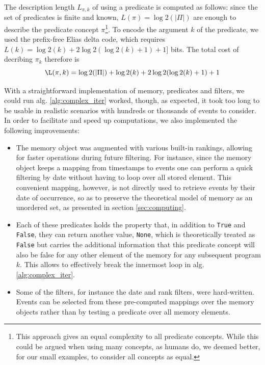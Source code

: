 \documentclass[entropy,article,submit,moreauthors,pdftex]{Definitions/mdpi}
\begin{document}
The description length $L_{\pi, k}$ of using a predicate is computed as follows: since the set of predicates is finite and known, $L(\pi) = \log2(|\Pi|)$ are enough to describe the predicate concept $\pi$\footnote{This approach gives an equal complexity to all predicate concepts. While this could be argued when using many concepts, as humans do, we deemed better, for our small examples, to consider all concepts as equal.}. To encode the argument $k$ of the predicate, we used the prefix-free Elias delta code, which requires $L(k) = \log2(k) + 2 \log2(\log2(k)+1) + 1]$ bits. The total cost of decribing $\pi_{k}$ therefore is
\begin{equation}
    \L(\pi, k) = \log2(|\Pi|) + \log2(k) + 2 \log2(\log2(k) + 1) + 1
\end{equation}

With a straightforward implementation of memory, predicates and filters, we could run alg. \ref{alg:complex_iter} worked, though, as expected, it took too
long to be usable in realistic scenarios with hundreds or thousands of events to
consider. In order to facilitate and speed up computations, we also implemented
the following improvements:
\begin{itemize}
    \item The memory object was augmented with various built-in rankings, allowing
          for faster operations during future filtering. For instance, since the memory
          object keeps a mapping from timestamps to events one can perform a quick
          filtering by date without having to loop over all stored element. This convenient mapping,
          however, is not directly used to retrieve events by their date of occurrence, so as to
          preserve the theoretical model of memory as an unordered set, as presented in
          section \ref{sec:computing}.

    \item Each of these predicates holds the property that, in addition to
          \texttt{True} and \texttt{False}, they can return another value,
          \texttt{None}, which is theoretically treated as \texttt{False} but carries
          the additional information that this predicate concept will also be false for
          any other element of the memory for any subsequent program $k$. This allows to
          effectively break the innermost loop in alg. \ref{alg:complex_iter}.

    \item Some of the filters, for instance the date and rank filters, were
          hard-written. Events can be selected from these pre-computed mappings over the memory objects
          rather than by testing a predicate over all memory elements.
\end{itemize}
\end{document}

